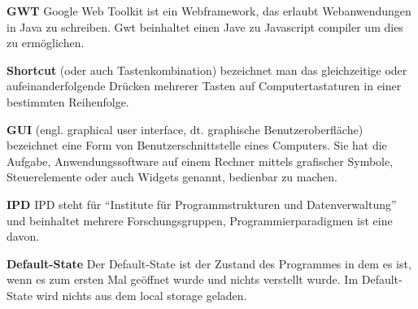 \documentclass[parskip=full,11pt,twoside]{scrartcl}
\begin{document}
\textbf{GWT}
\newline
Google Web Toolkit ist ein Webframework, das erlaubt Webanwendungen in Java zu schreiben. Gwt beinhaltet einen Jave zu Javascript compiler um dies zu ermöglichen.

\textbf{Shortcut}
\newline
(oder auch Tastenkombination) bezeichnet man das gleichzeitige oder aufeinanderfolgende Drücken mehrerer Tasten auf Computertastaturen in einer bestimmten Reihenfolge.

\textbf{GUI}
\newline
(engl. graphical user interface, dt. graphische Benutzeroberfläche) bezeichnet eine Form von Benutzerschnittstelle eines Computers. Sie hat die Aufgabe, Anwendungssoftware auf einem Rechner mittels grafischer Symbole, Steuerelemente oder auch Widgets genannt, bedienbar zu machen.

\textbf{IPD}
\newline
IPD steht für \enquote{Institute für Programmstrukturen und Datenverwaltung} und beinhaltet mehrere Forschungsgruppen, Programmierparadigmen ist eine davon.

\textbf{Default-State}
\newline
Der Default-State ist der Zustand des Programmes in dem es ist, wenn es zum ersten Mal geöffnet wurde und nichts verstellt wurde. Im Default-State wird nichts aus dem local storage geladen.
\end{document}

